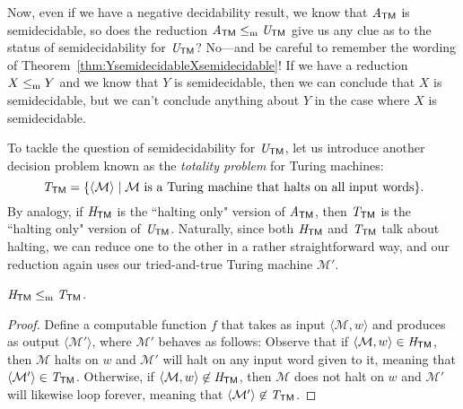 Now, even if we have a negative decidability result, we know that $\mathit{A}_{\textsf{TM}}$ is semidecidable, so does the reduction $\mathit{A}_{\textsf{TM}} \leq_{\mathrm{m}} \mathit{U}_{\textsf{TM}}$ give us any clue as to the status of semidecidability for $\mathit{U}_{\textsf{TM}}$? No---and be careful to remember the wording of Theorem~\ref{thm:YsemidecidableXsemidecidable}! If we have a reduction $X \leq_{\mathrm{m}} Y$ and we know that $Y$ is semidecidable, then we can conclude that $X$ is semidecidable, but we can't conclude anything about $Y$ in the case where $X$ is semidecidable.

To tackle the question of semidecidability for $\mathit{U}_{\textsf{TM}}$, let us introduce another decision problem known as the \emph{totality problem} for Turing machines:
\begin{equation*}
\mathit{T}_{\textsf{TM}} = \{\langle \mathcal{M} \rangle \mid \mathcal{M} \text{ is a Turing machine that halts on all input words}\}.
\end{equation*}
By analogy, if $\mathit{H}_{\textsf{TM}}$ is the ``halting only" version of $\mathit{A}_{\textsf{TM}}$, then $\mathit{T}_{\textsf{TM}}$ is the ``halting only" version of $\mathit{U}_{\textsf{TM}}$. Naturally, since both $\mathit{H}_{\textsf{TM}}$ and $\mathit{T}_{\textsf{TM}}$ talk about halting, we can reduce one to the other in a rather straightforward way, and our reduction again uses our tried-and-true Turing machine $\mathcal{M}'$.

\begin{lemma}\label{lem:HTMmanyonereducibleTTM}
$\mathit{H}_{\textsf{TM}} \leq_{\mathrm{m}} \mathit{T}_{\textsf{TM}}$.

\begin{proof}
Define a computable function $f$ that takes as input $\langle \mathcal{M}, w \rangle$ and produces as output $\langle \mathcal{M}' \rangle$, where $\mathcal{M}'$ behaves as follows:
Observe that if $\langle \mathcal{M}, w \rangle \in \mathit{H}_{\textsf{TM}}$, then $\mathcal{M}$ halts on $w$ and $\mathcal{M}'$ will halt on any input word given to it, meaning that $\langle \mathcal{M}' \rangle \in \mathit{T}_{\textsf{TM}}$. Otherwise, if $\langle \mathcal{M}, w \rangle \not\in \mathit{H}_{\textsf{TM}}$, then $\mathcal{M}$ does not halt on $w$ and $\mathcal{M}'$ will likewise loop forever, meaning that $\langle \mathcal{M}' \rangle \not\in \mathit{T}_{\textsf{TM}}$.
\end{proof}
\end{lemma}

